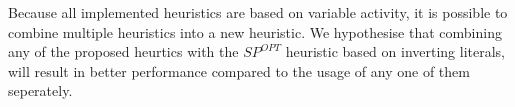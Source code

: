
Because all implemented heuristics are based on variable activity, it is possible to combine
multiple heuristics into a new heuristic.
We hypothesise that combining any of the proposed heurtics with the $SP^{OPT}$ heuristic based on
inverting literals, will result in better performance compared to the usage of any one of them
seperately.
